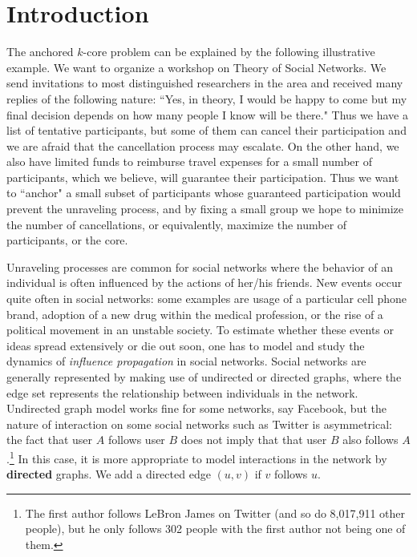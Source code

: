 \documentclass[11pt,a4paper]{article}
\begin{document}
\section{Introduction}\label{sec:intro}
The anchored $k$-core problem can be explained by the following illustrative example. We want
to organize a workshop on Theory of Social Networks. We send invitations to most  distinguished researchers in the area and
received many  replies of the following nature: ``Yes, in theory, I would be happy to come but my final decision  depends on
how many   people I know will be there."  Thus  we have a list of  tentative participants, but some of them can cancel their
participation and we are afraid that the cancellation process
may escalate. On the other hand, we also have  limited funds to reimburse travel expenses for
a small number of participants, which we believe, will guarantee their participation. Thus we want to ``anchor" a small subset
of  participants whose guaranteed participation would prevent the unraveling process, and by
fixing a small group   we hope to minimize the number of cancellations, or equivalently,
maximize the number of participants, or the core.

Unraveling processes are common for social networks where the behavior of an individual is often influenced by the actions of
her/his friends. New events occur quite often in social networks: some examples are usage of a particular cell phone brand,
adoption of a new drug within the medical profession, or the rise of a political movement in an unstable society. To estimate
whether these events or ideas spread extensively or die out soon, one has  to model and study the dynamics of \emph{influence
propagation} in social networks. Social networks are generally represented by making use of  undirected or directed graphs,
where the edge set represents  the relationship between individuals in the network. Undirected graph  model works fine for
some networks, say Facebook, but the nature of interaction on some social networks such as Twitter is asymmetrical:  the fact
that  user $A$ follows  user $B$ does not imply that that user $B$ also follows $A$.\footnote{The first author follows LeBron
James on Twitter (and so do 8,017,911 other people), but he only follows 302 people with the first author not being one of
them.}  In this case, it is more appropriate to model interactions in  the network by \textbf{directed} graphs. We add a
directed edge $(u,v)$ if $v$ follows $u$.
\end{document}
